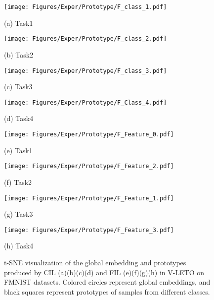 \begin{figure*}[!t] 
	\begin{minipage}{0.24\linewidth}
		\centerline{\texttt{[image: Figures/Exper/Prototype/F\_class\_1.pdf]}}
		\centerline{(a) Task1}
	\end{minipage}
    \begin{minipage}{0.24\linewidth}
		\centerline{\texttt{[image: Figures/Exper/Prototype/F\_class\_2.pdf]}}
		\centerline{(b) Task2}
	\end{minipage}
	\begin{minipage}{0.24\linewidth}
		\centerline{\texttt{[image: Figures/Exper/Prototype/F\_class\_3.pdf]}}
		\centerline{(c) Task3}
	\end{minipage}
    \begin{minipage}{0.24\linewidth}
		\centerline{\texttt{[image: Figures/Exper/Prototype/F\_Class\_4.pdf]}}
		\centerline{(d) Task4}
	\end{minipage}

    \begin{minipage}{0.24\linewidth}
		\centerline{\texttt{[image: Figures/Exper/Prototype/F\_Feature\_0.pdf]}}
		\centerline{(e) Task1}
	\end{minipage}
    \begin{minipage}{0.24\linewidth}
		\centerline{\texttt{[image: Figures/Exper/Prototype/F\_Feature\_2.pdf]}}
		\centerline{(f) Task2}
	\end{minipage}
	\begin{minipage}{0.24\linewidth}
		\centerline{\texttt{[image: Figures/Exper/Prototype/F\_Feature\_1.pdf]}}
		\centerline{(g) Task3}
	\end{minipage}
    \begin{minipage}{0.24\linewidth}
		\centerline{\texttt{[image: Figures/Exper/Prototype/F\_Feature\_3.pdf]}}
		\centerline{(h) Task4}
	\end{minipage}
\caption{t-SNE visualization of the global embedding and prototypes produced by CIL (a)(b)(c)(d) and FIL (e)(f)(g)(h) in V-LETO on FMNIST datasets.
Colored circles represent global embeddings, and black squares represent prototypes of samples from different classes.}
	\label{Fig: Vis_CIL}
\end{figure*}


